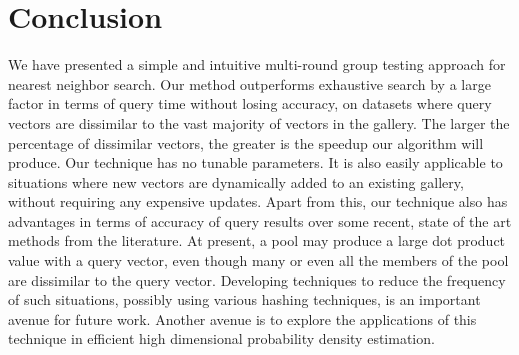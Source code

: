 \documentclass[sigconf, anonymous, review]{acmart}
\begin{document}
\section{Conclusion}
\label{sec:conclusion}
We have presented a simple and intuitive multi-round group testing approach for nearest neighbor search. Our method outperforms exhaustive search by a large factor in terms of query time without losing accuracy, on datasets where query vectors are dissimilar to the vast majority of vectors in the gallery. The larger the percentage of dissimilar vectors, the greater is the speedup our algorithm will produce. Our technique has no tunable parameters. It is also easily applicable to situations where new vectors are dynamically added to an existing gallery, without requiring any expensive updates. Apart from this, our technique also has advantages in terms of accuracy of query results over some recent, state of the art methods from the literature. At present, a pool may produce a large dot product value with a query vector, even though many or even all the members of the pool are dissimilar to the query vector. Developing techniques to reduce the frequency of such situations, possibly using various hashing techniques, is an important avenue for future work. Another avenue is to explore the applications of this technique in efficient high dimensional probability density estimation.



\end{document}

